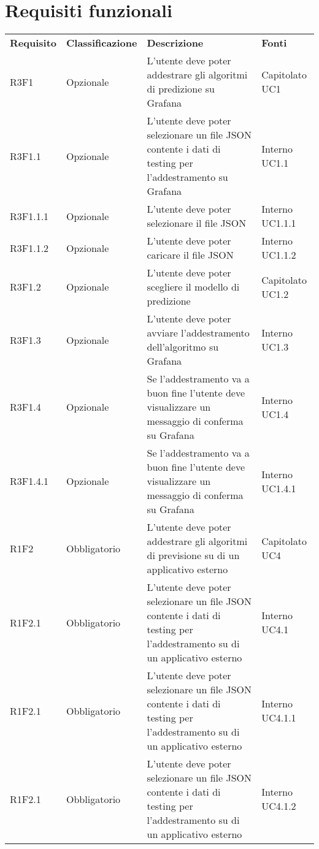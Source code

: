 \section{Requisiti funzionali}
	\begin{longtable} {
		>{}p{24mm} 
		>{}p{32mm}
		>{}p{40mm} 
		>{}p{24.5mm}
		}
	\rowcolor{gray!50}
		\textbf{Requisito} & \textbf{Classificazione} & \textbf{Descrizione} & \textbf{Fonti} 	\TBstrut \\
		R3F1 & Opzionale & L'utente deve poter addestrare gli algoritmi di predizione su Grafana\glo & Capitolato UC1 \TBstrut \\ [2mm]
		R3F1.1 & Opzionale & L'utente deve poter selezionare un file JSON contente i dati di testing per l'addestramento su Grafana\glo & Interno UC1.1 \TBstrut \\ [2mm]
		R3F1.1.1 & Opzionale & L'utente deve poter selezionare il file JSON & Interno UC1.1.1 \TBstrut \\ [2mm]
		R3F1.1.2 & Opzionale & L'utente deve poter caricare il file JSON & Interno UC1.1.2 \TBstrut \\ [2mm]
		R3F1.2 & Opzionale & L'utente deve poter scegliere il modello di predizione & Capitolato UC1.2 \TBstrut \\ [2mm]
		R3F1.3 & Opzionale & L'utente deve poter avviare l'addestramento dell'algoritmo su Grafana\glo & Interno UC1.3 \TBstrut \\ [2mm]
		R3F1.4 & Opzionale & Se l'addestramento va a buon fine l'utente deve visualizzare un messaggio di conferma su Grafana\glo & Interno UC1.4 \TBstrut \\ [2mm]
		R3F1.4.1 & Opzionale & Se l'addestramento va a buon fine l'utente deve visualizzare un messaggio di conferma su Grafana\glo & Interno UC1.4.1 \TBstrut \\ [2mm]
		
		R1F2 & Obbligatorio & L'utente deve poter addestrare gli algoritmi di previsione su di un applicativo esterno & Capitolato UC4 \TBstrut \\ [2mm]
		R1F2.1 & Obbligatorio & L'utente deve poter selezionare un file JSON contente i dati di testing per l'addestramento su di un applicativo esterno & Interno UC4.1 \TBstrut \\ [2mm]
		R1F2.1 & Obbligatorio & L'utente deve poter selezionare un file JSON contente i dati di testing per l'addestramento su di un applicativo esterno & Interno UC4.1.1 \TBstrut \\ [2mm]
		R1F2.1 & Obbligatorio & L'utente deve poter selezionare un file JSON contente i dati di testing per l'addestramento su di un applicativo esterno & Interno UC4.1.2 \TBstrut \\ [2mm]
		

\end{longtable}
